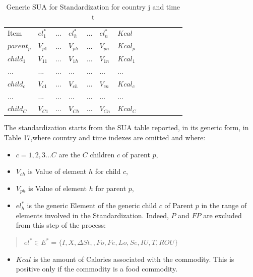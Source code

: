 \documentclass[]{article}
\providecommand{\tightlist}{%
  \setlength{\itemsep}{0pt}\setlength{\parskip}{0pt}}
\begin{document}
\begin {table}[H]
\begin{center}
\caption {Generic SUA for Standardization for country j and time t}

\begin{tabular}{lllllllllllll}
& & & & & \\
 \hline
Item & $el^{*}_{1}$ & ... & $el^{*}_{h}$ & ...& $el^{*}_{n}$ & $Kcal$\\ 
 \hline
$parent_{p}$ & $V_{p1}$ & ...& $V_{ph}$ & ...& $V_{pn}$ & $Kcal_{p}$\\ 
$child_{1}$ & $V_{11}$ & ... & $V_{1h}$ & ...& $V_{1n}$ & $Kcal_{1}$\\ 
... & ... & ... & ... & ... & ... & ... & \\ 
$child_{c}$ & $V_{c1}$ & ... & $V_{ch}$ & ...& $V_{cn}$ & $Kcal_{c}$\\ 
... & ... & ... & ... & ... & ... & ... & \\ 
$child_{C}$ & $V_{C1}$ & ... & $V_{Ch}$ & ...& $V_{Cn}$ & $Kcal_{C}$\\ 
 \hline
\end{tabular}
\end{center}
\end {table}

The standardization starts from the SUA table reported, in its generic
form, in Table 17,where country and time indexes are omitted and where:

\begin{itemize}
\tightlist
\item
  \(c = 1,2,3...C\) are the \(C\) children \(c\) of parent \(p\),
\item
  \(V_{ch}\) is Value of element \(h\) for child \(c\),
\item
  \(V_{ph}\) is Value of element \(h\) for parent \(p\),
\item
  \(el^{*}_{h}\) is the generic Element of the generic child \(c\) of
  Parent \(p\) in the range of elements involved in the Standardization.
  Indeed, \(P\) and \(FP\) are excluded from this step of the process:
\end{itemize}

\begin{quote}
\(el^{*} \in E^{*} = \{I,X,\Delta St, ,Fo,Fe,Lo,Se,IU,T,ROU\}\)
\end{quote}

\begin{itemize}
\tightlist
\item
  \(Kcal\) is the amount of Calories associated with the commodity. This
  is positive only if the commodity is a food commodity.
\end{itemize}
\end{document}
